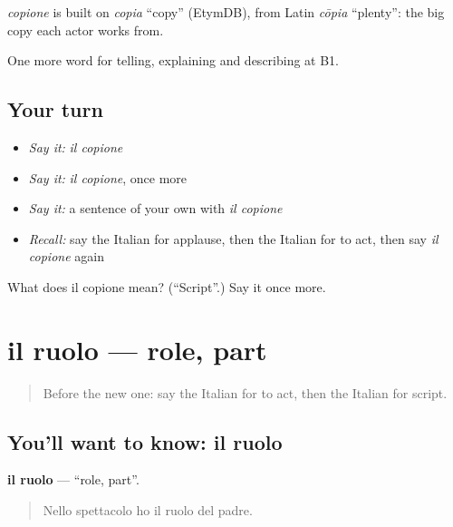\begin{cousinweb}
\emph{copione} is built on \emph{copia} \textquotedblleft{}copy\textquotedblright{} (EtymDB), from Latin \emph{cōpia} \textquotedblleft{}plenty\textquotedblright{}: the big copy each actor works from.
\end{cousinweb}

\begin{grammarlens}[title={What you've built}]
One more word for telling, explaining and describing at B1.
\end{grammarlens}

\subsection*{Your turn}
\begin{itemize}
\raggedright
  \item \emph{Say it:} \emph{il copione}
  \item \emph{Say it:} \emph{il copione}, once more
  \item \emph{Say it:} a sentence of your own with \emph{il copione}
  \item \emph{Recall:} say the Italian for applause, then the Italian for to act, then say \emph{il copione} again
\end{itemize}

\begin{tcolorbox}[breakable,colback=teal!4,colframe=teal!35!black,title={Before you move on}]
What does il copione mean? (\textquotedblleft{}Script\textquotedblright{}.) Say it once more.
\end{tcolorbox}
\section[il ruolo]{il ruolo — role, part}

\label{lesson:IT-C520-ruolo}



\begin{quote}
Before the new one: say the Italian for to act, then the Italian for script.
\end{quote}

\subsection*{You'll want to know: il ruolo}
\textbf{il ruolo} — \textquotedblleft{}role, part\textquotedblright{}.

\begin{quote}
Nello spettacolo ho il ruolo del padre.
\end{quote}

